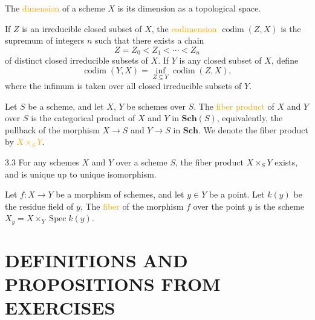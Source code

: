 \begin{definition}
	The \textcolor{orange}{dimension} of a scheme $X$ is its dimension as a topological space.
	
	If $Z$ is an irreducible closed subset of $X$, the \textcolor{orange}{codimension} $\operatorname{codim}(Z,X)$ is the supremum of integers $n$ such that there exists a chain
	\begin{equation*}
		Z=Z_0<Z_1<\cdots<Z_n
	\end{equation*}
	of distinct closed irreducible subsets of $X$. If $Y$ is any closed subset of $X$, define
	\begin{equation*}
		\operatorname{codim}(Y,X)=\inf_{Z\subseteq Y}\operatorname{codim}(Z,X),
	\end{equation*}
	where the infimum is taken over all closed irreducible subsets of $Y$.
\end{definition}

\begin{definition}
	Let $S$ be a scheme, and let $X$, $Y$ be schemes over $S$. The \textcolor{orange}{fiber product} of $X$ and $Y$ over $S$ is the categorical product of $X$ and $Y$ in $\mathbf{Sch}(S)$, equivalently, the pullback of the morphism $X\rightarrow S$ and $Y\rightarrow S$ in $\mathbf{Sch}$. We denote the fiber product by \textcolor{orange}{$X\times_SY$}.
\end{definition}

\begin{theorem}{3.3}
	For any schemes $X$ and $Y$ over a scheme $S$, the fiber product $X\times_SY$ exists, and is unique up to unique isomorphism.
\end{theorem}

\begin{definition}
	Let $f:X\rightarrow Y$ be a morphism of schemes, and let $y\in Y$ be a point. Let $k(y)$ be the residue field of $y$, The \textcolor{orange}{fiber} of the morphism $f$ over the point $y$ is the scheme $X_y=X\times_Y\operatorname{Spec}k(y)$.
\end{definition}

\section*{DEFINITIONS AND PROPOSITIONS FROM EXERCISES}

